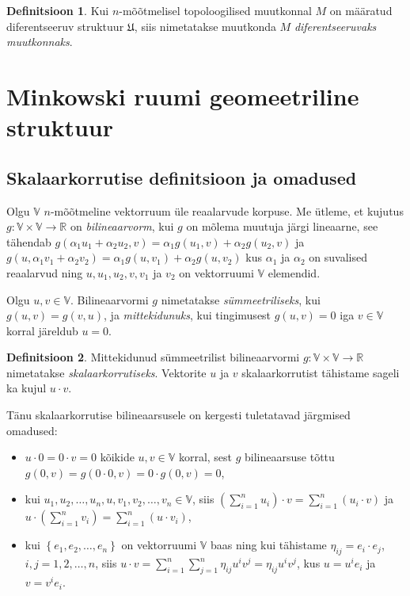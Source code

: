 \documentclass[12pt]{article}
\theoremstyle{plain}
\theoremstyle{definition}
\newtheorem{definitsioon}{Definitsioon}[section]
\numberwithin{equation}{section}
\def\R{{\mathbb R}}
\def\V{{\mathbb V}}
\begin{document}
\begin{definitsioon}
Kui $n$-mõõtmelisel topoloogilised muutkonnal $M$ on mää\-ratud 
diferentseeruv struktuur $\mathfrak{U}$, siis nimetatakse muutkonda 
$M$ \emph{diferentseeruvaks muutkonnaks}.
\end{definitsioon}

\newpage
\section{Minkowski ruumi geomeetriline struktuur}

\subsection{Skalaarkorrutise definitsioon ja omadused}

Olgu $\V$ $n$-mõõtmeline vektorruum üle reaalarvude korpuse. 
Me ütleme, et kujutus $g : \V \times \V 
\rightarrow \R$ on \emph{bilineaarvorm}, kui $g$ on mõlema muutuja 
järgi lineaarne, see tähendab 
$g \left( \alpha_1 u_1 + \alpha_2 u_2, v \right) = 
\alpha_1 g \left( u_1, v \right) + \alpha_2 g \left( u_2, v \right)$ 
ja $g \left( u, \alpha_1 v_1 + \alpha_2 v_2 \right) = 
\alpha_1 g \left( u, v_1 \right) + \alpha_2 g \left( u, v_2 \right)$ 
kus $\alpha_1$ ja $\alpha_2$ on suvalised reaalarvud ning 
$u, u_1, u_2, v, v_1$ ja $v_2$ on vektorruumi $\V$ elemendid. 

Olgu $u, v \in \V$. Bilineaarvormi $g$ nimetatakse 
\emph{sümmeetriliseks}, kui $g \left( u, v \right) = 
g \left(v, u \right)$, ja \emph{mittekidunuks}, kui tingimusest 
$g \left( u, v \right) = 0$ iga $v \in \V$ korral järeldub  
$u = 0$.

\begin{definitsioon}
Mittekidunud sümmeetrilist bilineaarvormi 
$g: \V \times \V \rightarrow \R$ 
nimetatakse \emph{skalaarkorrutiseks}. Vektorite $u$ ja $v$ 
skalaarkorrutist tähistame sageli ka kujul $u \cdot v$.
\end{definitsioon}

Tänu skalaarkorrutise bilineaarsusele on kergesti tuletatavad 
järgmised omadused:
\begin{itemize}
\item $u \cdot 0 = 0 \cdot v = 0$ kõikide $u, v \in \V$ 
korral, sest $g$ bilineaarsuse tõttu $g \left(0, v\right) = 
g \left(0 \cdot 0, v \right) = 0 \cdot g \left(0, v \right) = 0$,
\item kui $u_1, u_2, \dots, u_n, u, v_1, v_2, \dots, v_n \in 
\V$, siis $\left( \sum_{i = 1}^{n} u_i \right) \cdot v = 
\sum_{i = 1}^{n}  \left( u_i \cdot v \right)$ ja 
$u \cdot \left( \sum_{i = 1}^{n} v_i \right) = 
\sum_{i = 1}^{n}  \left( u \cdot v_i \right)$,
\item kui $\left\lbrace e_1, e_2, \dots, e_n \right\rbrace$ on 
vektorruumi $\V$ baas ning kui tähistame $\eta_{ij} = 
e_i \cdot e_j$, $i,j = 1, 2, \dots, n$, siis $u \cdot v = 
\sum_{i = 1}^{n} \sum_{j = 1}^{n} \eta_{ij} u^i v^j = 
\eta_{ij} u^i v^j$, kus $u = u^i e_i$ ja $v = v^i e_i$.
\end{itemize}
\end{document}
